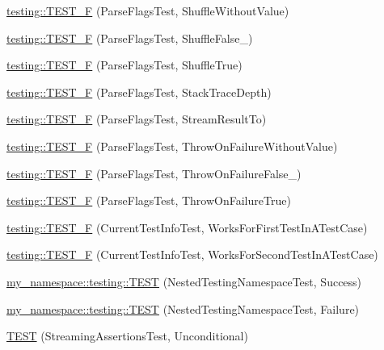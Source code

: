 \begin{DoxyCompactItemize}
\item 
\mbox{\hyperlink{namespacetesting_a23373676b5605f4446444568b03851c1}{testing\+::\+T\+E\+S\+T\+\_\+F}} (Parse\+Flags\+Test, Shuffle\+Without\+Value)
\item 
\mbox{\hyperlink{namespacetesting_ac510159c0bac8ecf77e0d3884569b314}{testing\+::\+T\+E\+S\+T\+\_\+F}} (Parse\+Flags\+Test, Shuffle\+False\+\_)
\item 
\mbox{\hyperlink{namespacetesting_a11ba77d82075e6b72cc2cc3a0568eb4b}{testing\+::\+T\+E\+S\+T\+\_\+F}} (Parse\+Flags\+Test, Shuffle\+True)
\item 
\mbox{\hyperlink{namespacetesting_a1061c3a0db32c0706e9beba39c4d4324}{testing\+::\+T\+E\+S\+T\+\_\+F}} (Parse\+Flags\+Test, Stack\+Trace\+Depth)
\item 
\mbox{\hyperlink{namespacetesting_aa4c92d2a72b78b58c0bf7f59fc2be6d6}{testing\+::\+T\+E\+S\+T\+\_\+F}} (Parse\+Flags\+Test, Stream\+Result\+To)
\item 
\mbox{\hyperlink{namespacetesting_a1b96e71b9d6bde57bb5f7536961b5076}{testing\+::\+T\+E\+S\+T\+\_\+F}} (Parse\+Flags\+Test, Throw\+On\+Failure\+Without\+Value)
\item 
\mbox{\hyperlink{namespacetesting_a1b5b5c2e1f15ff13cad4ac7d5415f271}{testing\+::\+T\+E\+S\+T\+\_\+F}} (Parse\+Flags\+Test, Throw\+On\+Failure\+False\+\_)
\item 
\mbox{\hyperlink{namespacetesting_a439e3e79125f5222ddd95b8036252061}{testing\+::\+T\+E\+S\+T\+\_\+F}} (Parse\+Flags\+Test, Throw\+On\+Failure\+True)
\item 
\mbox{\hyperlink{namespacetesting_a1e55a3ca18d877e1e83ce0ed9e7b5c79}{testing\+::\+T\+E\+S\+T\+\_\+F}} (Current\+Test\+Info\+Test, Works\+For\+First\+Test\+In\+A\+Test\+Case)
\item 
\mbox{\hyperlink{namespacetesting_a3775bdbb5d24619425c52103e7ae6434}{testing\+::\+T\+E\+S\+T\+\_\+F}} (Current\+Test\+Info\+Test, Works\+For\+Second\+Test\+In\+A\+Test\+Case)
\item 
\mbox{\hyperlink{namespacemy__namespace_1_1testing_ad673a1b79baca8e8c493774b2a4b0127}{my\+\_\+namespace\+::testing\+::\+T\+E\+ST}} (Nested\+Testing\+Namespace\+Test, Success)
\item 
\mbox{\hyperlink{namespacemy__namespace_1_1testing_aa568f6a68b9e42841f6da570ef62b623}{my\+\_\+namespace\+::testing\+::\+T\+E\+ST}} (Nested\+Testing\+Namespace\+Test, Failure)
\item 
\mbox{\hyperlink{_obj__test_2lib_2googletest-release-1_88_81_2googletest_2test_2gtest__unittest_8cc_a1118ea85887fba8f2dd371d1add98cd5}{T\+E\+ST}} (Streaming\+Assertions\+Test, Unconditional)

\end{DoxyCompactItemize}
